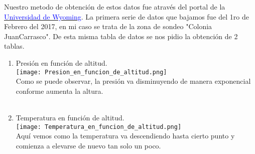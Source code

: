 \documentclass{article}
\begin{document}
Nuestro metodo de obtención de estos datos fue através del portal de la  \href{http://weather.uwyo.edu/upperair/sounding.html}{\textcolor{blue}{Universidad de Wyoming}}. La primera serie de datos que bajamos fue del 1ro de Febrero del 2017, en mi caso se trata de la zona de sondeo "Colonia JuanCarrasco". 
De esta misma tabla de datos se nos pidio la obtención de 2 tablas.
\newpage
\begin{enumerate}
\item \huge Presión en función de altitud.\\
\texttt{[image: Presion\_en\_funcion\_de\_altitud.png]}\\
\Large Como se puede observar, la presión va disminuyendo de manera exponencial conforme aumenta la altura.\\
\hfill \\




\item \huge  Temperatura en función de altitud.\\
\texttt{[image: Temperatura\_en\_funcion\_de\_altitud.png]}\\
\Large Aquí vemos como la temperatura va descendiendo hasta cierto punto y comienza a elevarse de nuevo tan solo un poco.  
\end{enumerate}


\newpage
\end{document}
